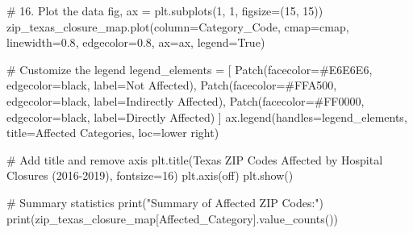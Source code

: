 \documentclass[
  letterpaper,
  DIV=11,
  numbers=noendperiod]{scrartcl}
\newenvironment{Shaded}{\begin{snugshade}}{\end{snugshade}}
\newcommand{\BuiltInTok}[1]{\textcolor[rgb]{0.00,0.23,0.31}{#1}}
\newcommand{\CommentTok}[1]{\textcolor[rgb]{0.37,0.37,0.37}{#1}}
\newcommand{\DecValTok}[1]{\textcolor[rgb]{0.68,0.00,0.00}{#1}}
\newcommand{\FloatTok}[1]{\textcolor[rgb]{0.68,0.00,0.00}{#1}}
\newcommand{\NormalTok}[1]{\textcolor[rgb]{0.00,0.23,0.31}{#1}}
\newcommand{\OperatorTok}[1]{\textcolor[rgb]{0.37,0.37,0.37}{#1}}
\newcommand{\StringTok}[1]{\textcolor[rgb]{0.13,0.47,0.30}{#1}}
\newcommand{\VariableTok}[1]{\textcolor[rgb]{0.07,0.07,0.07}{#1}}
\begin{document}
\begin{Shaded}
\begin{Highlighting}[]
\CommentTok{\# 16. Plot the data}
\NormalTok{fig, ax }\OperatorTok{=}\NormalTok{ plt.subplots(}\DecValTok{1}\NormalTok{, }\DecValTok{1}\NormalTok{, figsize}\OperatorTok{=}\NormalTok{(}\DecValTok{15}\NormalTok{, }\DecValTok{15}\NormalTok{))}
\NormalTok{zip\_texas\_closure\_map.plot(column}\OperatorTok{=}\StringTok{\textquotesingle{}Category\_Code\textquotesingle{}}\NormalTok{, cmap}\OperatorTok{=}\NormalTok{cmap, linewidth}\OperatorTok{=}\FloatTok{0.8}\NormalTok{,}
\NormalTok{                           edgecolor}\OperatorTok{=}\StringTok{\textquotesingle{}0.8\textquotesingle{}}\NormalTok{, ax}\OperatorTok{=}\NormalTok{ax, legend}\OperatorTok{=}\VariableTok{True}\NormalTok{)}

\CommentTok{\# Customize the legend}
\NormalTok{legend\_elements }\OperatorTok{=}\NormalTok{ [}
\NormalTok{    Patch(facecolor}\OperatorTok{=}\StringTok{\textquotesingle{}\#E6E6E6\textquotesingle{}}\NormalTok{, edgecolor}\OperatorTok{=}\StringTok{\textquotesingle{}black\textquotesingle{}}\NormalTok{, label}\OperatorTok{=}\StringTok{\textquotesingle{}Not Affected\textquotesingle{}}\NormalTok{),}
\NormalTok{    Patch(facecolor}\OperatorTok{=}\StringTok{\textquotesingle{}\#FFA500\textquotesingle{}}\NormalTok{, edgecolor}\OperatorTok{=}\StringTok{\textquotesingle{}black\textquotesingle{}}\NormalTok{, label}\OperatorTok{=}\StringTok{\textquotesingle{}Indirectly Affected\textquotesingle{}}\NormalTok{),}
\NormalTok{    Patch(facecolor}\OperatorTok{=}\StringTok{\textquotesingle{}\#FF0000\textquotesingle{}}\NormalTok{, edgecolor}\OperatorTok{=}\StringTok{\textquotesingle{}black\textquotesingle{}}\NormalTok{, label}\OperatorTok{=}\StringTok{\textquotesingle{}Directly Affected\textquotesingle{}}\NormalTok{)}
\NormalTok{]}
\NormalTok{ax.legend(handles}\OperatorTok{=}\NormalTok{legend\_elements,}
\NormalTok{          title}\OperatorTok{=}\StringTok{\textquotesingle{}Affected Categories\textquotesingle{}}\NormalTok{, loc}\OperatorTok{=}\StringTok{\textquotesingle{}lower right\textquotesingle{}}\NormalTok{)}

\CommentTok{\# Add title and remove axis}
\NormalTok{plt.title(}\StringTok{\textquotesingle{}Texas ZIP Codes Affected by Hospital Closures (2016{-}2019)\textquotesingle{}}\NormalTok{, fontsize}\OperatorTok{=}\DecValTok{16}\NormalTok{)}
\NormalTok{plt.axis(}\StringTok{\textquotesingle{}off\textquotesingle{}}\NormalTok{)}
\NormalTok{plt.show()}

\CommentTok{\# Summary statistics}
\BuiltInTok{print}\NormalTok{(}\StringTok{"Summary of Affected ZIP Codes:"}\NormalTok{)}
\BuiltInTok{print}\NormalTok{(zip\_texas\_closure\_map[}\StringTok{\textquotesingle{}Affected\_Category\textquotesingle{}}\NormalTok{].value\_counts())}
\end{Highlighting}
\end{Shaded}
\end{document}
